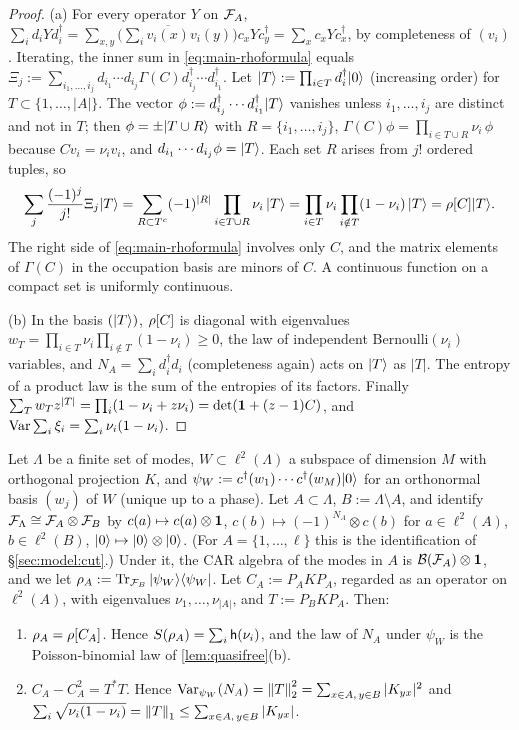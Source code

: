 \begin{proof}
(a) For every operator $Y$ on $\mathcal{F}_A$,
$\sum_id_iYd_i^\dagger=\sum_{x,y}\bigl(\sum_i\overline{v_i(x)}v_i(y)\bigr)c_xYc_y^\dagger=\sum_xc_xYc_x^\dagger$,
by completeness of $(v_i)$.  Iterating, the inner sum in \eqref{eq:main-rhoformula} equals
$\Xi_j:=\sum_{i_1,\dots,i_j}d_{i_1}\cdots d_{i_j}\Gamma(C)d^\dagger_{i_j}\cdots d^\dagger_{i_1}$.  Let
$|T\rangle:=\prod_{i\in T}d_i^\dagger|0\rangle$ (increasing order) for $T\subset\{1,\dots,|A|\}$.  The vector
$\phi:=d^\dagger_{i_j}\cdots d^\dagger_{i_1}|T\rangle$ vanishes unless $i_1,\dots,i_j$ are distinct and not in
$T$; then $\phi=\pm|T\cup R\rangle$ with $R=\{i_1,\dots,i_j\}$, $\Gamma(C)\phi=\prod_{i\in T\cup R}\nu_i\,\phi$
because $Cv_i=\nu_iv_i$, and $d_{i_1}\cdots d_{i_j}\phi=|T\rangle$.  Each set $R$ arises from $j!$ ordered
tuples, so
\[
  \sum_j\frac{(-1)^j}{j!}\Xi_j|T\rangle=\sum_{R\subset T^c}(-1)^{|R|}\prod_{i\in T\cup R}\nu_i\,|T\rangle
  =\prod_{i\in T}\nu_i\prod_{i\notin T}(1-\nu_i)\,|T\rangle=\rho[C]|T\rangle .
\]
The right side of \eqref{eq:main-rhoformula} involves only $C$, and the matrix elements of $\Gamma(C)$ in
the occupation basis are minors of $C$.  A continuous function on a compact set is uniformly continuous.

(b) In the basis $(|T\rangle)$, $\rho[C]$ is diagonal with eigenvalues
$w_T=\prod_{i\in T}\nu_i\prod_{i\notin T}(1-\nu_i)\ge0$, the law of independent Bernoulli$(\nu_i)$
variables, and $N_A=\sum_id_i^\dagger d_i$ (completeness again) acts on $|T\rangle$ as $|T|$.  The entropy of a
product law is the sum of the entropies of its factors.  Finally
$\sum_Tw_Tz^{|T|}=\prod_i(1-\nu_i+z\nu_i)=\det(\mathbf{1}+(z-1)C)$, and
$\operatorname{Var}\sum_i\xi_i=\sum_i\nu_i(1-\nu_i)$.
\end{proof}

\begin{lemma}\label{lem:slater}
Let $\Lambda$ be a finite set of modes, $W\subset\ell^2(\Lambda)$ a subspace of dimension $M$ with orthogonal
projection $K$, and $\psi_W:=c^\dagger(w_1)\cdots c^\dagger(w_M)|0\rangle$ for an orthonormal basis $(w_j)$ of $W$
(unique up to a phase).  Let $A\subset\Lambda$, $B:=\Lambda\setminus A$, and identify
$\mathcal{F}_\Lambda\cong\mathcal{F}_A\otimes\mathcal{F}_B$ by $c(a)\mapsto c(a)\otimes\mathbf{1}$, $c(b)\mapsto(-1)^{N_A}\otimes c(b)$ for
$a\in\ell^2(A)$, $b\in\ell^2(B)$, $|0\rangle\mapsto|0\rangle\otimes|0\rangle$.  (For $A=\{1,\dots,\ell\}$ this is the
identification of \S\ref{sec:model:cut}.)  Under it, the CAR algebra of the modes in $A$ is
$\mathcal B(\mathcal{F}_A)\otimes\mathbf{1}$, and we let $\rho_A:=\operatorname{Tr}_{\mathcal{F}_B}|\psi_W\rangle\langle \psi_W|$.  Let
$C_A:=P_AKP_A$, regarded as an operator on $\ell^2(A)$, with eigenvalues $\nu_1,\dots,\nu_{|A|}$, and
$T:=P_BKP_A$.  Then:
\begin{enumerate}[label=(\alph*)]
\item $\rho_A=\rho[C_A]$.  Hence $S(\rho_A)=\sum_i\mathsf{h}(\nu_i)$, and the law of $N_A$ under $\psi_W$ is the
Poisson-binomial law of \cref{lem:quasifree}(b).
\item $C_A-C_A^2=T^*T$.  Hence
$\operatorname{Var}_{\psi_W}(N_A)=\left\|T\right\|_2^2=\sum_{x\in A,\,y\in B}|K_{yx}|^2$ and
$\sum_i\sqrt{\nu_i(1-\nu_i)}=\left\|T\right\|_1\le\sum_{x\in A,\,y\in B}|K_{yx}|$.
\end{enumerate}
\end{lemma}

